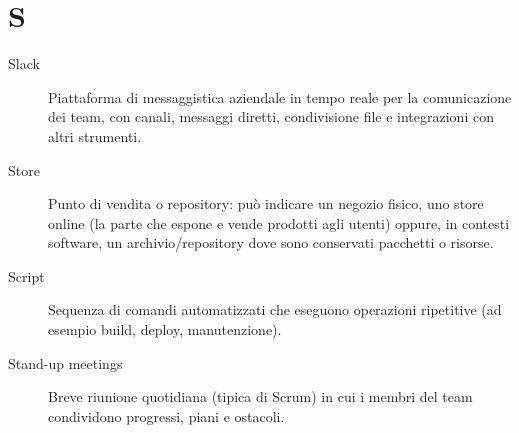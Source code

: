 \section*{S}
\begin{description}
    \item[Slack] Piattaforma di messaggistica aziendale in tempo reale per la comunicazione dei team, con canali, messaggi diretti, condivisione file e integrazioni con altri strumenti.
    \item[Store] Punto di vendita o repository: può indicare un negozio fisico, uno store online (la parte che espone e vende prodotti agli utenti) oppure, in contesti software, un archivio/repository dove sono conservati pacchetti o risorse.
    \item[Script] Sequenza di comandi automatizzati che eseguono operazioni ripetitive (ad esempio build, deploy, manutenzione).
    \item[Stand-up meetings] Breve riunione quotidiana (tipica di Scrum) in cui i membri del team condividono progressi, piani e ostacoli.
\end{description}

